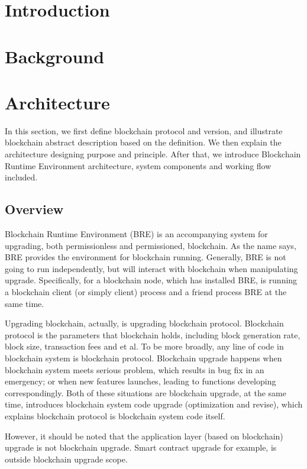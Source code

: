 \documentclass[sigplan,screen]{acmart}
\begin{document}
\section{Introduction}

\section{Background}

\section{Architecture}
In this section, we first define blockchain protocol and version, and illustrate
blockchain abstract description based on the definition. We then explain the
architecture designing purpose and principle. After that, we introduce Blockchain
Runtime Environment architecture, system components and working flow included.

\subsection{Overview}
Blockchain Runtime Environment (BRE) is an accompanying system for upgrading,
both permissionless and permissioned, blockchain. As the name says, BRE
provides the environment for blockchain running. Generally, BRE is not going to
run independently, but will interact with blockchain when manipulating
upgrade. Specifically, for a blockchain node, which has installed BRE, is
running a blockchain client (or simply client) process and a friend process BRE
at the same time.

Upgrading blockchain, actually, is upgrading blockchain protocol.
Blockchain protocol is the parameters that blockchain holds, including block
generation rate, block size, transaction fees and et al. To be
more broadly, any line of code in blockchain system is blockchain protocol.
Blockchain upgrade happens when blockchain system meets serious problem,
which results in bug fix in an emergency; or when new features launches,
leading to functions developing correspondingly. Both of these situations
are blockchain upgrade, at the same time, introduces blockchain system code
upgrade (optimization and revise), which explains blockchain protocol is
blockchain system code itself.

However, it should be noted that the application layer (based on blockchain)
upgrade is not blockchain upgrade. Smart contract upgrade for
example, is outside blockchain upgrade scope.
\end{document}
